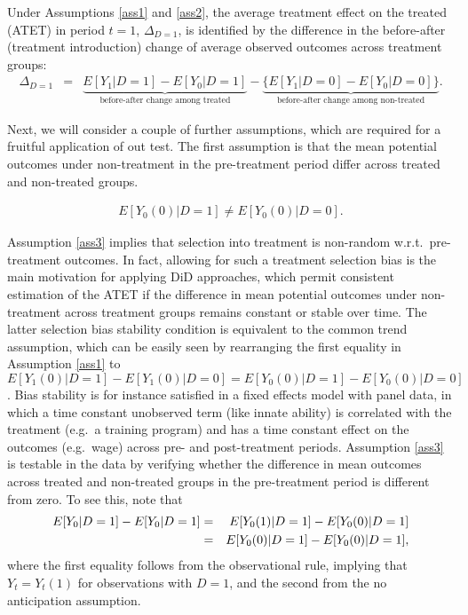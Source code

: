 {	Under Assumptions \ref{ass1} and \ref{ass2}, the average treatment effect on the treated (ATET) in period $t=1$, $\Delta_{D=1}$, is identified by the difference in the before-after (treatment introduction) change of average observed outcomes across treatment groups:
	\begin{eqnarray}\label{DiDobs}
		\Delta_{D=1}
		&=&\underbrace{E[Y_1|D=1]-E[Y_0|D=1]}_{\textrm{before-after change among treated}}-\underbrace{\{E[Y_1|D=0]-E[Y_0|D=0]\}}_{\textrm{before-after change among non-treated}}.
	\end{eqnarray}
	
	Next, we will consider a couple of further assumptions, which are required for a fruitful application of out test. The first assumption is that the mean potential outcomes under non-treatment in the pre-treatment period differ across treated and non-treated groups.
	\begin{assumption}\label{ass3}
		\begin{eqnarray*}
			E[Y_0(0)|D=1]\neq E[Y_0(0)|D=0].
		\end{eqnarray*}
	\end{assumption}
	\noindent Assumption \ref{ass3} implies that selection into treatment is non-random w.r.t.\ pre-treatment outcomes. In fact, allowing for such a treatment selection bias is the main motivation for applying DiD approaches, which permit consistent estimation of the ATET if the difference in mean potential outcomes under non-treatment across treatment groups remains constant or stable over time. The latter  selection bias stability condition is equivalent to the common trend assumption, which can be easily seen by rearranging the first equality in Assumption \ref{ass1} to $E[Y_1(0)|D=1]-E[Y_1(0)|D=0]=E[Y_0(0)|D=1]-E[Y_0(0)|D=0]$. Bias stability is for instance satisfied in a fixed effects model with panel data, in which a time constant unobserved term (like innate ability) is correlated with the treatment (e.g.\ a training program) and has a time constant effect on the outcomes (e.g.\ wage) across pre- and post-treatment periods.  Assumption \ref{ass3} is testable in the data by verifying whether the difference in mean outcomes across treated and non-treated groups in the pre-treatment period is different from zero. To see this, note that
	\begin{eqnarray}\label{diffpretreat}
		E[Y_0|D=1]-E[Y_0|D=1]&=&E[Y_0(1)|D=1]-E[Y_0(0)|D=1]\notag\\
		&=&E[Y_0(0)|D=1]-E[Y_0(0)|D=1],
	\end{eqnarray}
	where the first equality follows from the observational rule, implying that $Y_t=Y_t(1)$ for observations with $D=1$, and the second from the no anticipation assumption.
	
}
